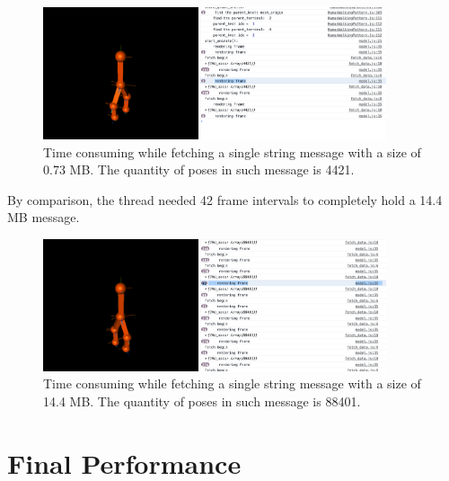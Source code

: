 \begin{figure}[htbp]
	\centering
	\includegraphics[width=0.9\textwidth]{
		fileForWriting/1mb-test}
	\caption[Time consuming while receiving a single message with a size of 0.73 MB]{Time consuming while fetching a single string message with a size of 0.73 MB. The quantity of poses in such message is 4421.}
	\label{fig:0.73-size}
\end{figure}

By comparison, the thread needed 42 frame intervals to completely hold a 14.4 MB message.

\begin{figure}[htbp]
	\centering
	\includegraphics[width=0.9\textwidth]{
		fileForWriting/14mb-test}
	\caption[Time consuming while receiving a single message with a size of 14.4 MB]{Time consuming while fetching a single string message with a size of 14.4 MB. The quantity of poses in such message is 88401.}
	\label{fig:14-size}
\end{figure}

\section{Final Performance}

